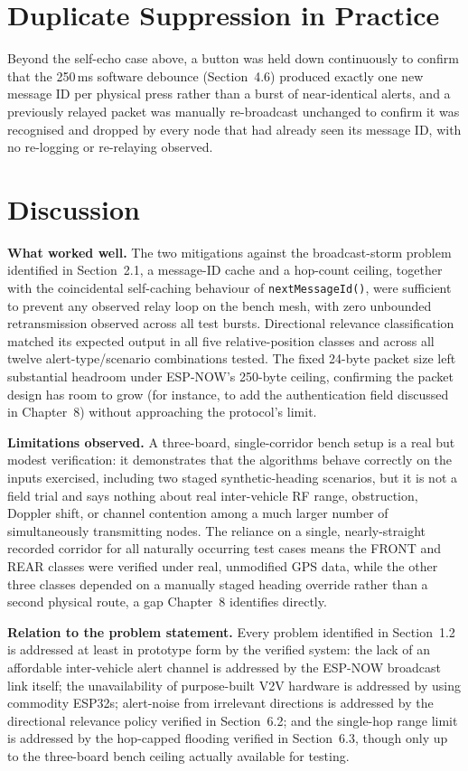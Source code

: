 \documentclass[12pt,a4paper]{report}
\begin{document}
\section{Duplicate Suppression in Practice}
Beyond the self-echo case above, a button was held down continuously to confirm that the 250\,ms software debounce (Section~4.6) produced exactly one new message ID per physical press rather than a burst of near-identical alerts, and a previously relayed packet was manually re-broadcast unchanged to confirm it was recognised and dropped by every node that had already seen its message ID, with no re-logging or re-relaying observed.

\section{Discussion}
\textbf{What worked well.} The two mitigations against the broadcast-storm problem identified in Section~2.1, a message-ID cache and a hop-count ceiling, together with the coincidental self-caching behaviour of \texttt{nextMessageId()}, were sufficient to prevent any observed relay loop on the bench mesh, with zero unbounded retransmission observed across all test bursts. Directional relevance classification matched its expected output in all five relative-position classes and across all twelve alert-type/scenario combinations tested. The fixed 24-byte packet size left substantial headroom under ESP-NOW's 250-byte ceiling, confirming the packet design has room to grow (for instance, to add the authentication field discussed in Chapter~8) without approaching the protocol's limit.

\textbf{Limitations observed.} A three-board, single-corridor bench setup is a real but modest verification: it demonstrates that the algorithms behave correctly on the inputs exercised, including two staged synthetic-heading scenarios, but it is not a field trial and says nothing about real inter-vehicle RF range, obstruction, Doppler shift, or channel contention among a much larger number of simultaneously transmitting nodes. The reliance on a single, nearly-straight recorded corridor for all naturally occurring test cases means the FRONT and REAR classes were verified under real, unmodified GPS data, while the other three classes depended on a manually staged heading override rather than a second physical route, a gap Chapter~8 identifies directly.

\textbf{Relation to the problem statement.} Every problem identified in Section~1.2 is addressed at least in prototype form by the verified system: the lack of an affordable inter-vehicle alert channel is addressed by the ESP-NOW broadcast link itself; the unavailability of purpose-built V2V hardware is addressed by using commodity ESP32s; alert-noise from irrelevant directions is addressed by the directional relevance policy verified in Section~6.2; and the single-hop range limit is addressed by the hop-capped flooding verified in Section~6.3, though only up to the three-board bench ceiling actually available for testing.
\end{document}
